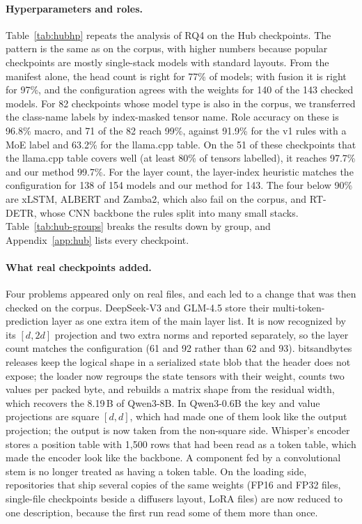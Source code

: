 {\paragraph{Hyperparameters and roles.} Table~\ref{tab:hubhp} repeats the analysis of RQ4 on the Hub checkpoints. The pattern is the same as on the corpus, with higher numbers because popular checkpoints are mostly single-stack models with standard layouts. From the manifest alone, the head count is right for 77\% of models; with fusion it is right for 97\%, and the configuration agrees with the weights for 140 of the 143 checked models. For 82 checkpoints whose model type is also in the corpus, we transferred the class-name labels by index-masked tensor name. Role accuracy on these is 96.8\% macro, and 71 of the 82 reach 99\%, against 91.9\% for the v1 rules with a MoE label and 63.2\% for the llama.cpp table. On the 51 of these checkpoints that the llama.cpp table covers well (at least 80\% of tensors labelled), it reaches 97.7\% and our method 99.7\%. For the layer count, the layer-index heuristic matches the configuration for 138 of 154 models and our method for 143. The four below 90\% are xLSTM, ALBERT and Zamba2, which also fail on the corpus, and RT-DETR, whose CNN backbone the rules split into many small stacks. Table~\ref{tab:hub-groups} breaks the results down by group, and Appendix~\ref{app:hub} lists every checkpoint.



\paragraph{What real checkpoints added.} Four problems appeared only on real files, and each led to a change that was then checked on the corpus. DeepSeek-V3 and GLM-4.5 store their multi-token-prediction layer as one extra item of the main layer list. It is now recognized by its $[d, 2d]$ projection and two extra norms and reported separately, so the layer count matches the configuration (61 and 92 rather than 62 and 93). bitsandbytes releases keep the logical shape in a serialized state blob that the header does not expose; the loader now regroups the state tensors with their weight, counts two values per packed byte, and rebuilds a matrix shape from the residual width, which recovers the 8.19\,B of Qwen3-8B. In Qwen3-0.6B the key and value projections are square $[d,d]$, which had made one of them look like the output projection; the output is now taken from the non-square side. Whisper's encoder stores a position table with 1{,}500 rows that had been read as a token table, which made the encoder look like the backbone. A component fed by a convolutional stem is no longer treated as having a token table. On the loading side, repositories that ship several copies of the same weights (FP16 and FP32 files, single-file checkpoints beside a diffusers layout, LoRA files) are now reduced to one description, because the first run read some of them more than once.
}
